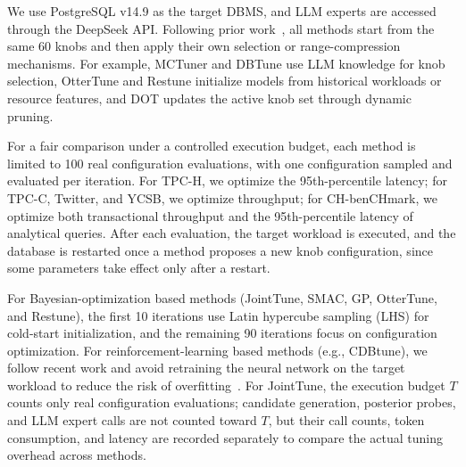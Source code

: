 \documentclass[runningheads]{llncs}
\begin{document}
We use PostgreSQL v14.9 as the target DBMS, and LLM experts are accessed
through the DeepSeek API. Following prior work~\cite{gptuner,mctuner,cdbtune},
all methods start from the same 60 knobs and then apply their own
selection or range-compression mechanisms. For example, MCTuner and
DBTune use LLM knowledge for knob selection, OtterTune and Restune
initialize models from historical workloads or resource features, and
DOT updates the active knob set through dynamic pruning.

For a fair comparison under a controlled execution budget, each method is
limited to 100 real configuration evaluations, with one configuration
sampled and evaluated per iteration. For TPC-H, we optimize the
95th-percentile latency; for TPC-C, Twitter, and YCSB, we optimize
throughput; for CH-benCHmark, we optimize both transactional throughput
and the 95th-percentile latency of analytical queries. After each
evaluation, the target workload is executed, and the database is
restarted once a method proposes a new knob configuration, since some
parameters take effect only after a restart.

For Bayesian-optimization based methods (JointTune, SMAC, GP, OtterTune,
and Restune), the first 10 iterations use Latin hypercube sampling (LHS)
for cold-start initialization, and the remaining 90 iterations focus on
configuration optimization. For reinforcement-learning based methods
(e.g., CDBtune), we follow recent work and avoid retraining the neural
network on the target workload to reduce the risk of
overfitting~\cite{zhang2021facilitating}. For JointTune, the execution
budget $T$ counts only real configuration evaluations; candidate
generation, posterior probes, and LLM expert calls are not counted
toward $T$, but their call counts, token consumption, and latency are
recorded separately to compare the actual tuning overhead across methods.
\end{document}
